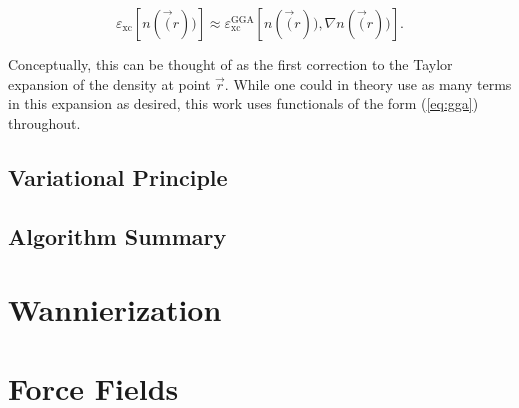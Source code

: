     \begin{equation}
    \label{eq:gga}
        \varepsilon_\text{xc}[n(\vec(r))] \approx \varepsilon_\text{xc}^\text{GGA}[n(\vec(r)),\nabla n(\vec(r))].
    \end{equation}
    
    \noindent Conceptually, this can be thought of as the first correction to the Taylor expansion of the density at point $\vec{r}$. While one could in theory use as many terms in this expansion as desired, this work uses functionals of the form (\ref{eq:gga}) throughout.
    
    \subsection{Variational Principle}
    
    \subsection{Algorithm Summary}
    

\section{Wannierization}

\section{Force Fields}

